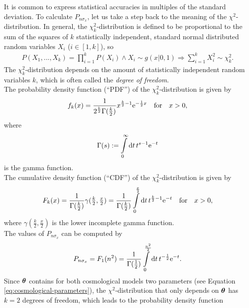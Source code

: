 \noindent It is common to express statistical accuracies in multiples of the standard deviation. 
To calculate $P_{n\sigma_{x}}$, let us take a step back to the meaning of the $\chi^2$-distribution. In general, the $\chi_{k}^{2}$-distribution is defined to be proportional to the sum of the squares of $k$ statistically independent, standard normal distributed random variables $X_{i}$ ($i \in [1,k]$), so
\begin{align}
    P(X_{1}, ..., X_{k}) = \prod_{i = 1}^{k} P(X_{i}) \land X_{i} \sim g(x \vert 0, 1) \Rightarrow  \sum_{i = 1}^{k} X_{i}^2 \sim \chi_{k}^2. 
\end{align}
The $\chi_{k}^{2}$-distribution depends on the amount of statistically independent random variables $k$, which is often called the \textit{degree of freedom}. \\
The probability density function (``PDF'') of the $\chi_{k}^{2}$-distribution is given by
\begin{align}
    f_{k}(x) = \frac{1}{2^{\frac{k}{2}} \Gamma (\tfrac{k}{2})} x^{\frac{k}{2} - 1} \mathrm{e}^{-\frac{1}{2}x} \quad \text{for} \quad x > 0, \label{eq:probability-density-function}
\end{align}
where 
\begin{align}
    \Gamma(s) := \int\limits_{0}^{\infty} \dd{t} t^{s - 1} \mathrm{e}^{-t} \label{eq:gamma-function}  
\end{align}
is the gamma function. \\
The cumulative density function (``CDF'') of the $\chi_{k}^{2}$-distribution is given by 
\begin{align}
    F_{k}(x) = \frac{1}{\Gamma(\tfrac{k}{2})} \gamma(\tfrac{k}{2}, \tfrac{x}{2}) = \frac{1}{\Gamma(\tfrac{k}{2})} \int\limits_{0}^{\frac{x}{2}} \dd{t} t^{\frac{k}{2} - 1} \mathrm{e}^{-t} \quad \text{for} \quad x > 0, \label{eq:cumulative-distribution-function}
\end{align}
where $\gamma(\tfrac{k}{2}, \tfrac{x}{2})$ is the lower incomplete gamma function. \\
The values of $P_{n \sigma_{x}}$ can be computed by 
\begin{align}
    P_{n \sigma_{x}} = F_{1}(n^2) = \frac{1}{\Gamma(\tfrac{1}{2})} \int\limits_{0}^{\frac{n^2}{2}} \dd{t} t^{-\frac{1}{2}} \mathrm{e}^{-t}. 
\end{align}
Since $\vb*{\theta}$ contains for both cosmological models two parameters (see Equation \eqref{eq:cosmological-parameters}), the $\chi^2$-distribution that only depends on $\vb*{\theta}$ has $k = 2$ degrees of freedom, which leads to the probability density function 

